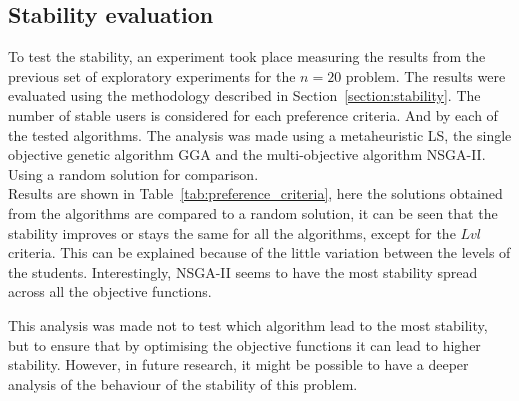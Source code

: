 \subsection{Stability evaluation}

To test the stability, an experiment took place measuring the results from the previous set of exploratory experiments for the $n=20$ problem. The results were evaluated using the methodology described in Section~\ref{section:stability}. The number of stable users is considered for each preference criteria. And by each of the tested algorithms. The analysis was made using a metaheuristic LS, the single objective genetic algorithm GGA and the multi-objective algorithm NSGA-II. Using a random solution for comparison.\\

Results are shown in Table~\ref{tab:preference_criteria}, here the solutions obtained from the algorithms are compared to a random solution, it can be seen that the stability improves or stays the same for all the algorithms, except for the $Lvl$ criteria. This can be explained because of the little variation between the levels of the students. Interestingly, NSGA-II seems to have the most stability spread across all the objective functions.\\

\begin{table}[H]
\centering
{}
\caption{Number of stable students in the groups by preference criteria}
\label{tab:preference_criteria}
\end{table}

This analysis was made not to test which algorithm lead to the most stability, but to ensure that by optimising the objective functions it can lead to higher stability. However, in future research, it might be possible to have a deeper analysis of the behaviour of the stability of this problem.
    
